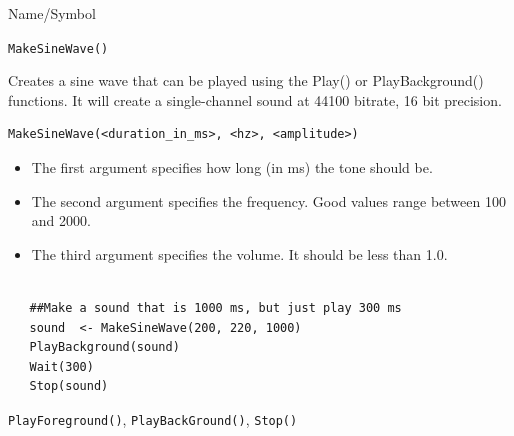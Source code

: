 \begin{desc}{Name/Symbol}
\item[Name/Symbol]	\verb+MakeSineWave()+

\item[Description] 
Creates a sine wave that can be played using the Play() or PlayBackground() functions.  It will create a single-channel sound at 44100 bitrate, 16 bit precision.

\item[Usage]
\begin{verbatim}
MakeSineWave(<duration_in_ms>, <hz>, <amplitude>)
\end{verbatim}
\begin{itemize}
 \item  The first argument specifies how long (in ms) the tone should be.
 \item The second argument specifies the frequency.  Good values range between 100 and 2000.
 \item The third argument specifies the volume.  It should be less than 1.0.
 \end{itemize}
 
\item[Example]	
\begin{verbatim}

   ##Make a sound that is 1000 ms, but just play 300 ms
   sound  <- MakeSineWave(200, 220, 1000)
   PlayBackground(sound)
   Wait(300)
   Stop(sound)

\end{verbatim}

\item[See Also]    	\verb+PlayForeground()+, \verb+PlayBackGround()+, \verb+Stop()+
\end{desc}






